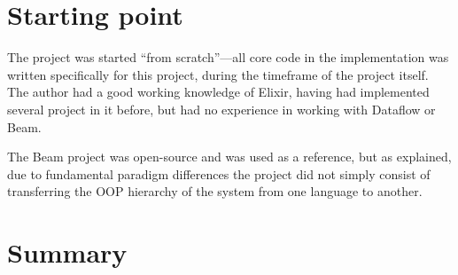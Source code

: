\section{Starting point}\label{sec:prep:starting}

The project was started ``from scratch''---all core code in the implementation was written specifically for this project, during the timeframe of the project itself.
The author had a good working knowledge of Elixir, having had implemented several project in it before, but had no experience in working with Dataflow or Beam.

The Beam project was open-source and was used as a reference, but as explained, due to fundamental paradigm differences the project did not simply consist of transferring the OOP hierarchy of the system from one language to another.

\section{Summary}\label{sec:prep:summary}

